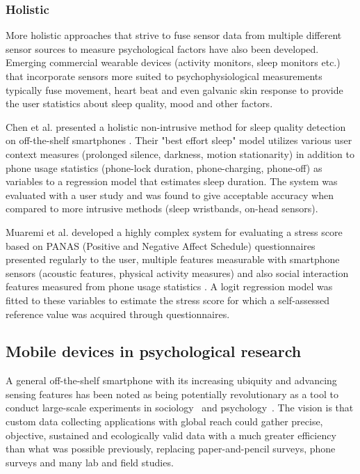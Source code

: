 \subsubsection{Holistic}

More holistic approaches that strive to fuse sensor data from multiple different
sensor sources to measure psychological factors have also been developed.
Emerging commercial wearable devices (activity monitors, sleep monitors etc.)
that incorporate sensors more suited to psychophysiological measurements
typically fuse movement, heart beat and even galvanic skin response to provide
the user statistics about sleep quality, mood and other factors.

Chen et al. presented a holistic non-intrusive method for sleep quality
detection on off-the-shelf smartphones
\cite{chen13unobtrusive}.
Their "best effort sleep" model
utilizes various user context measures (prolonged silence, darkness,
motion stationarity) in addition
to phone usage statistics (phone-lock duration, phone-charging, phone-off) as
variables to a regression model that estimates sleep duration. The system
was evaluated with a user study and was found to give acceptable accuracy
when compared to more intrusive methods (sleep wristbands, on-head sensors).

Muaremi et al. developed a highly complex system for evaluating a stress score
based on PANAS (Positive and Negative Affect Schedule) questionnaires presented
regularly to the user, multiple features measurable with
smartphone sensors (acoustic features, physical activity measures) and also
social interaction features measured from phone usage statistics
\cite{muaremi13towards}.
A logit
regression model was fitted to these variables to estimate the stress score
for which a self-assessed reference value was acquired through questionnaires.

\subsection{Mobile devices in psychological research}

A general off-the-shelf smartphone with its increasing ubiquity and advancing
sensing features has been noted as being potentially revolutionary as a tool to
conduct large-scale experiments in sociology~\cite{raento09smartphones} and
psychology~\cite{miller12smartphone}. The vision is that custom data collecting
applications with global reach could gather precise, objective, sustained and
ecologically valid data with a much greater efficiency than what was possible
previously, replacing paper-and-pencil surveys, phone surveys and many lab
and field studies.

